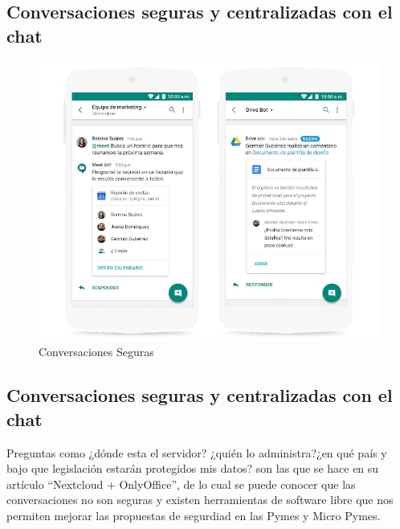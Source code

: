 \documentclass[
  letterpaper,
  DIV=11,
  numbers=noendperiod]{scrartcl}
\begin{document}
\hypertarget{conversaciones-seguras-y-centralizadas-con-el-chat}{%
\subsection{Conversaciones seguras y centralizadas con el
chat}\label{conversaciones-seguras-y-centralizadas-con-el-chat}}

\begin{figure}

{\centering \includegraphics{media/conversaciones.png}

}

\caption{Conversaciones Seguras}

\end{figure}

\hypertarget{conversaciones-seguras-y-centralizadas-con-el-chat-1}{%
\subsection{Conversaciones seguras y centralizadas con el
chat}\label{conversaciones-seguras-y-centralizadas-con-el-chat-1}}

Preguntas como ¿dónde esta el servidor? ¿quién lo administra?¿en qué
país y bajo que legislación estarán protegidos mis datos? son las que se
hace \textcite{NextcloudOnlyOfficeRafael2020} en su artículo ``Nextcloud
+ OnlyOffice'', de lo cual se puede conocer que las conversaciones no
son seguras y existen herramientas de software libre que nos permiten
mejorar las propuestas de segurdiad en las Pymes y Micro Pymes.
\end{document}
